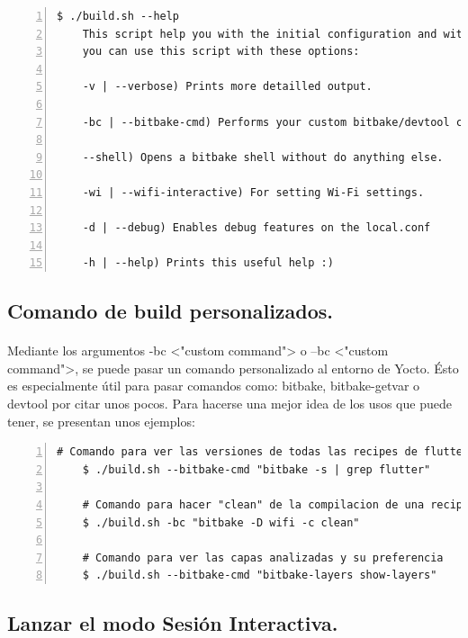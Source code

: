 \begin{lstlisting}[style=consola, numbers=left]
    $ ./build.sh --help
    This script help you with the initial configuration and with the build process.
    you can use this script with these options:

    -v | --verbose) Prints more detailled output.

    -bc | --bitbake-cmd) Performs your custom bitbake/devtool command.

    --shell) Opens a bitbake shell without do anything else.

    -wi | --wifi-interactive) For setting Wi-Fi settings.

    -d | --debug) Enables debug features on the local.conf

    -h | --help) Prints this useful help :)
\end{lstlisting}

\subsection{Comando de build personalizados.}

\paragraph{}Mediante los argumentos -bc <"custom command"> o --bc <"custom command">,
se puede pasar un comando personalizado al entorno de Yocto. Ésto es especialmente útil
para pasar comandos como: bitbake, bitbake-getvar o devtool por citar unos pocos. Para
hacerse una mejor idea de los usos que puede tener, se presentan unos ejemplos:

\begin{lstlisting}[style=consola, numbers=left]
    # Comando para ver las versiones de todas las recipes de flutter
    $ ./build.sh --bitbake-cmd "bitbake -s | grep flutter"

    # Comando para hacer "clean" de la compilacion de una recipe especifica
    $ ./build.sh -bc "bitbake -D wifi -c clean"

    # Comando para ver las capas analizadas y su preferencia
    $ ./build.sh --bitbake-cmd "bitbake-layers show-layers"
\end{lstlisting}

\subsection{Lanzar el modo Sesión Interactiva.}

